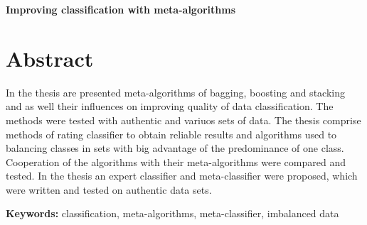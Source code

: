 \begin{center}
\large \bf
Improving classification with meta-algorithms
\end{center}

\section*{Abstract}
In the thesis are presented meta-algorithms of bagging, boosting and stacking and as well their influences on improving quality of data classification.  The methods were tested with authentic and variuos sets of data.
The thesis comprise methods of rating classifier to obtain reliable results and algorithms
used to balancing classes in sets with big advantage of the predominance of one class. Cooperation of the algorithms with their meta-algorithms were compared and tested. In the thesis an expert classifier and meta-classifier were proposed, which were written and tested on authentic data sets.

\bigskip
{\noindent\bf Keywords:} classification, meta-algorithms, meta-classifier, imbalanced data

\vfill